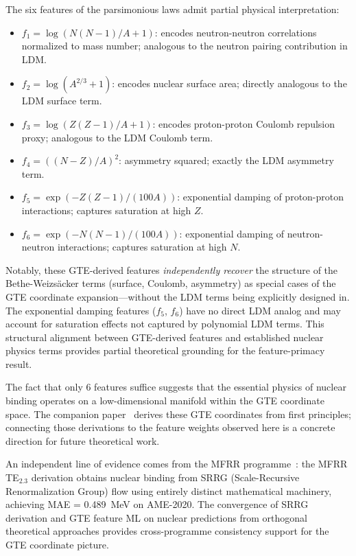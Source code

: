 \documentclass[9pt,twocolumn]{extarticle}
\begin{document}
The six features of the parsimonious laws admit partial physical interpretation:

\begin{itemize}[nosep]
\item $f_1 = \log(N(N-1)/A + 1)$: encodes neutron-neutron correlations normalized to mass number; analogous to the neutron pairing contribution in LDM.
\item $f_2 = \log(A^{2/3} + 1)$: encodes nuclear surface area; directly analogous to the LDM surface term.
\item $f_3 = \log(Z(Z-1)/A + 1)$: encodes proton-proton Coulomb repulsion proxy; analogous to the LDM Coulomb term.
\item $f_4 = ((N-Z)/A)^2$: asymmetry squared; exactly the LDM asymmetry term.
\item $f_5 = \exp(-Z(Z-1)/(100A))$: exponential damping of proton-proton interactions; captures saturation at high $Z$.
\item $f_6 = \exp(-N(N-1)/(100A))$: exponential damping of neutron-neutron interactions; captures saturation at high $N$.
\end{itemize}

Notably, these GTE-derived features \emph{independently recover} the structure of the Bethe-Weizsäcker terms (surface, Coulomb, asymmetry) as special cases of the GTE coordinate expansion---without the LDM terms being explicitly designed in. The exponential damping features ($f_5$, $f_6$) have no direct LDM analog and may account for saturation effects not captured by polynomial LDM terms. This structural alignment between GTE-derived features and established nuclear physics terms provides partial theoretical grounding for the feature-primacy result.

The fact that only 6 features suffice suggests that the essential physics of nuclear binding operates on a low-dimensional manifold within the GTE coordinate space. The companion paper~\cite{SpivackSM} derives these GTE coordinates from first principles; connecting those derivations to the feature weights observed here is a concrete direction for future theoretical work.

An independent line of evidence comes from the MFRR programme~\cite{SpivackMFRR}: the MFRR TE$_{2.3}$ derivation obtains nuclear binding from SRRG (Scale-Recursive Renormalization Group) flow using entirely distinct mathematical machinery, achieving MAE = 0.489~MeV on AME-2020. The convergence of SRRG derivation and GTE feature ML on nuclear predictions from orthogonal theoretical approaches provides cross-programme consistency support for the GTE coordinate picture.
\end{document}
